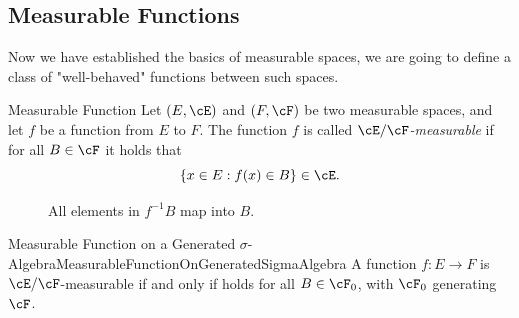 \subsection{Measurable Functions}

Now we have established the basics of measurable spaces, we are going to define a class of "well-behaved" functions between such spaces.

\begin{defn}{Measurable Function}{}
	Let \((E, \cE)\) and \((F, \cF)\) be two measurable spaces, and let \(f\) be a function from \(E\) to \(F\). The function \(f\) is called \textit{\(\cE/\cF\)-measurable} if for all \(B \in \cF\) it holds that
	\begin{equation}
		\{x \in E : f(x) \in B\} \in \cE.
		\label{eq:MeasurabilityCondition}
	\end{equation}
\end{defn}

\begin{figure}[H]
	\centering
	\caption{All elements in \(f^{-1}B\) map into \(B\).}
	\label{fig:InverseImageMapping}
\end{figure}

\begin{thm}{Measurable Function on a Generated \(\sigma\)-Algebra}{MeasurableFunctionOnGeneratedSigmaAlgebra}
	A function \(f : E \to F\) is \(\cE/\cF\)-measurable if and only if  holds for all \(B \in \cF_0\), with \(\cF_0\) generating \(\cF\).
\end{thm}


